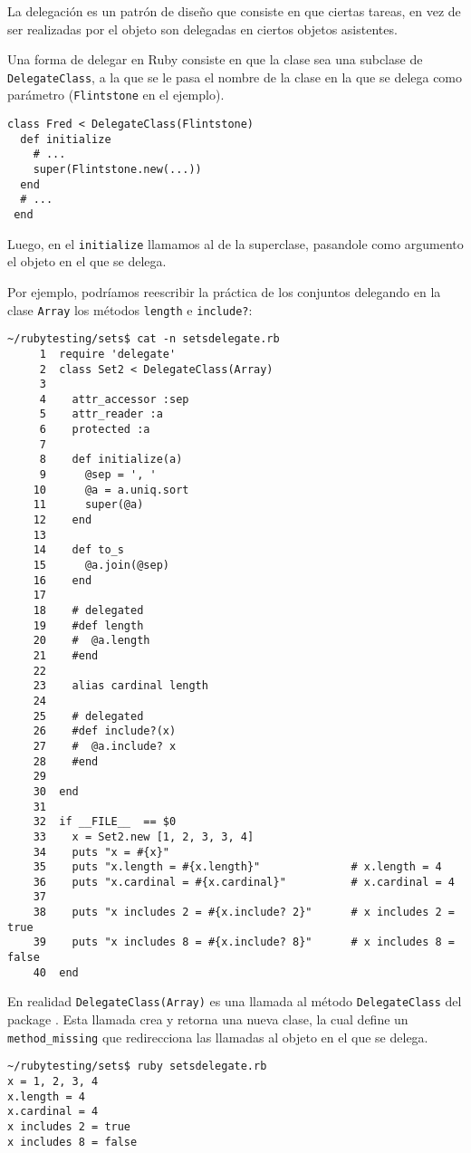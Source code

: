 La delegación es un patrón de diseño que consiste en que ciertas tareas, en vez de ser realizadas por el objeto
son delegadas en ciertos objetos asistentes.

Una forma de delegar en Ruby consiste en que la clase sea una subclase de \verb|DelegateClass|,
a la que se le pasa el nombre de la clase en la que se delega como parámetro (\verb|Flintstone| en el ejemplo).
\begin{verbatim}
class Fred < DelegateClass(Flintstone)
  def initialize
    # ...
    super(Flintstone.new(...))
  end
  # ...
 end
\end{verbatim}
Luego, en el \verb|initialize| llamamos al de la superclase, pasandole como argumento el objeto en el que se delega.

Por ejemplo, podríamos reescribir la práctica de los conjuntos delegando en la clase \verb|Array| los métodos \verb|length|
e \verb|include?|:

\begin{verbatim}
~/rubytesting/sets$ cat -n setsdelegate.rb 
     1  require 'delegate'
     2  class Set2 < DelegateClass(Array)
     3  
     4    attr_accessor :sep
     5    attr_reader :a
     6    protected :a
     7  
     8    def initialize(a)
     9      @sep = ', '
    10      @a = a.uniq.sort
    11      super(@a)
    12    end
    13  
    14    def to_s
    15      @a.join(@sep)
    16    end
    17  
    18    # delegated
    19    #def length 
    20    #  @a.length
    21    #end
    22  
    23    alias cardinal length
    24  
    25    # delegated
    26    #def include?(x)
    27    #  @a.include? x
    28    #end
    29  
    30  end
    31  
    32  if __FILE__  == $0
    33    x = Set2.new [1, 2, 3, 3, 4]
    34    puts "x = #{x}"
    35    puts "x.length = #{x.length}"              # x.length = 4 
    36    puts "x.cardinal = #{x.cardinal}"          # x.cardinal = 4
    37  
    38    puts "x includes 2 = #{x.include? 2}"      # x includes 2 = true
    39    puts "x includes 8 = #{x.include? 8}"      # x includes 8 = false
    40  end
\end{verbatim}
En realidad \verb|DelegateClass(Array)| es una llamada al método \verb|DelegateClass|
del package . Esta llamada crea y retorna una nueva clase, la cual define un \verb|method_missing| que redirecciona las llamadas al objeto en el que se 
delega.
\begin{verbatim}
~/rubytesting/sets$ ruby setsdelegate.rb 
x = 1, 2, 3, 4
x.length = 4
x.cardinal = 4
x includes 2 = true
x includes 8 = false
\end{verbatim}

